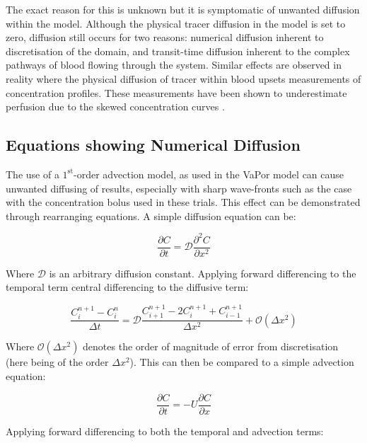 \documentclass[11pt,english,a4paper,twoside,openright]{report}
\begin{document}
{{{{{{{{The exact reason for this is unknown but it is symptomatic of unwanted diffusion within the model. Although the physical tracer diffusion in the model is set to zero, diffusion still occurs for two reasons: numerical diffusion inherent to discretisation of the domain, and transit-time diffusion inherent to the complex pathways of blood flowing through the system. Similar effects are observed in reality where the physical diffusion of tracer within blood upsets measurements of concentration profiles. These measurements have been shown to underestimate perfusion due to the skewed concentration curves \cite{wu2003tracer}.

\subsection{Equations showing Numerical Diffusion}

The use of a $1^{\text{st}}$-order advection model, as used in the VaPor model can cause unwanted diffusing of results, especially with sharp wave-fronts such as the case with the concentration bolus used in these trials. This effect can be demonstrated through rearranging equations. A simple diffusion equation can be:

\begin{equation}
\frac{\partial C}{\partial t} = \mathcal{D}\frac{\partial^{2} C}{\partial x^{2}}
\label{Eq:DiffusionNormal}
\end{equation}

Where $\mathcal{D}$ is an arbitrary diffusion constant. Applying forward differencing to the temporal term central differencing to the diffusive term:

\begin{equation}
\frac{C_{i}^{n+1}-C_{i}^{n}}{\Delta t} = \mathcal{D}\frac{C_{i+1}^{n+1}-2C_{i}^{n+1}+C_{i-1}^{n+1}}{\Delta x^{2}} + \mathcal{O}(\Delta x^{2})
\label{Eq:DiffusionDiscrete}
\end{equation}

Where $\mathcal{O}(\Delta x^{2})$ denotes the order of magnitude of error from discretisation (here being of the order $\Delta x^{2}$). This can then be compared to a simple advection equation:

\begin{equation}
\frac{\partial C}{\partial t} = -U\frac{\partial C}{\partial x}
\label{Eq:AdvectionNormal}
\end{equation}

Applying forward differencing to both the temporal and advection terms:

}}}}}}}}
\end{document}
